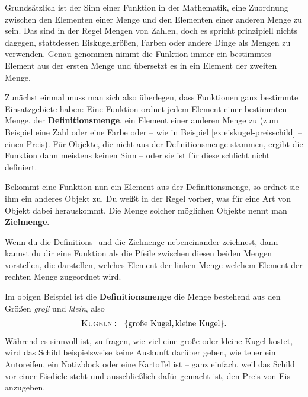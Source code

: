 \documentclass[../../main.tex]{subfiles}
\begin{document}
Grundsätzlich ist der Sinn einer Funktion in der Mathematik, eine Zuordnung zwischen den Elementen einer Menge und den Elementen einer anderen Menge zu sein. Das sind in der Regel Mengen von Zahlen, doch es spricht prinzipiell nichts dagegen, stattdessen Eiskugelgrößen, Farben oder andere Dinge als Mengen zu verwenden. Genau genommen nimmt die Funktion immer ein bestimmtes Element aus der ersten Menge und übersetzt es in ein Element der zweiten Menge.

\parpic[r]{
}
Zunächst einmal muss man sich also überlegen, dass Funktionen ganz bestimmte Einsatzgebiete haben: Eine Funktion ordnet jedem Element einer bestimmten Menge, der \textbf{Definitionsmenge}, ein Element einer anderen Menge zu (zum Beispiel eine Zahl oder eine Farbe oder -- wie in Beispiel \ref{ex:eiskugel-preisschild} -- einen Preis). Für Objekte, die nicht aus der Definitionsmenge stammen, ergibt die Funktion dann meistens keinen Sinn -- oder sie ist für diese schlicht nicht definiert.

Bekommt eine Funktion nun ein Element aus der Definitionsmenge, so ordnet sie ihm ein anderes Objekt zu. Du weißt in der Regel vorher, was für eine Art von Objekt dabei herauskommt. Die Menge solcher möglichen Objekte nennt man \textbf{Zielmenge}.

Wenn du die Definitions- und die Zielmenge nebeneinander zeichnest, dann kannst du dir eine Funktion als die Pfeile zwischen diesen beiden Mengen vorstellen, die darstellen, welches Element der linken Menge welchem Element der rechten Menge zugeordnet wird.

\begin{example}{}
    Im obigen Beispiel ist die \textbf{Definitionsmenge} die Menge bestehend aus den Größen \emph{groß} und \emph{klein}, also 
    \[\textsc{Kugeln}\mathbin{\coloneqq}\{\text{große Kugel},\text{kleine Kugel}\}.\]
    Während es sinnvoll ist, zu fragen, wie viel eine große oder kleine Kugel kostet, wird das Schild beispielsweise keine Auskunft darüber geben, wie teuer ein Autoreifen, ein Notizblock oder eine Kartoffel ist -- ganz einfach, weil das Schild vor einer Eisdiele steht und ausschließlich dafür gemacht ist, den Preis von Eis anzugeben.
\end{example}
\end{document}
